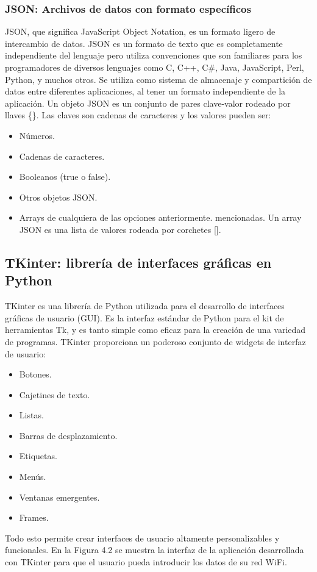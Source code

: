         \subsubsection{JSON: Archivos de datos con formato específicos}
        JSON, que significa JavaScript Object Notation, es un formato ligero de intercambio de datos. JSON es un formato de texto que es completamente independiente del lenguaje pero utiliza convenciones que son familiares para los programadores de diversos lenguajes como C, C++, C\#, Java, JavaScript, Perl, Python, y muchos otros. Se utiliza como sistema de almacenaje y compartición de datos entre diferentes aplicaciones, al tener un formato independiente de la aplicación.
            Un objeto JSON es un conjunto de pares clave-valor rodeado por llaves \{\}. Las claves son cadenas de caracteres y los valores pueden ser:
            \begin{itemize}
                \item Números.
                \item Cadenas de caracteres.
                \item Booleanos (true o false).
                \item Otros objetos JSON.
                \item Arrays de cualquiera de las opciones anteriormente. mencionadas. Un array JSON es una lista de valores rodeada por corchetes [].
            \end{itemize}

    \subsection{TKinter:  librería de interfaces gráficas en Python}
    TKinter \cite{wiki:tkinter} es una librería de Python utilizada para el desarrollo de interfaces gráficas de usuario (GUI). Es la interfaz estándar de Python para el kit de herramientas Tk, y es tanto simple como eficaz para la creación de una variedad de programas. TKinter proporciona un poderoso conjunto de widgets de interfaz de usuario:
    \begin{itemize}
        \item Botones.
        \item Cajetines de texto.
        \item Listas.
        \item Barras de desplazamiento.
        \item Etiquetas.
        \item Menús.
        \item Ventanas emergentes.
        \item Frames.
    \end{itemize}
    Todo esto permite crear interfaces de usuario altamente personalizables y funcionales. En la Figura 4.2 se muestra la interfaz de la aplicación desarrollada con TKinter para que el usuario pueda introducir los datos de su red WiFi.


